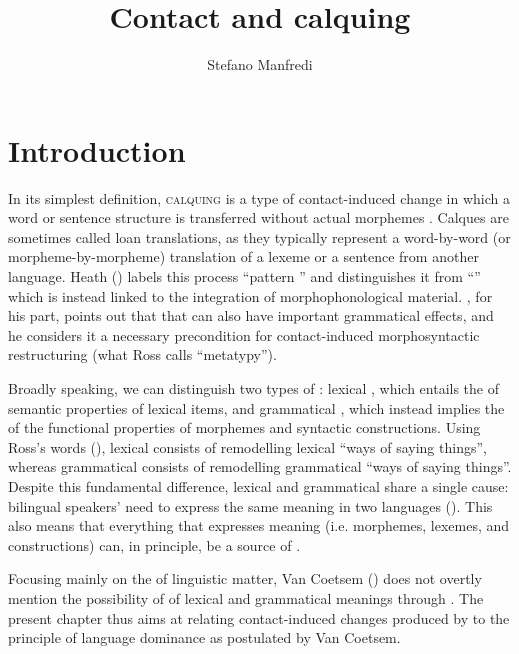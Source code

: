 \documentclass[output=paper]{langsci/langscibook}
\author{Stefano Manfredi\affiliation{CNRS, SeDyL}}
\title{Contact and calquing}
\begin{document}
\maketitle 
  

\section{Introduction}

In its simplest definition, \textsc{calquing} is a type of contact-induced change in which a word or sentence structure is transferred without actual morphemes \citep[260]{Thomason2001}. Calques are sometimes called loan translations, as they typically represent a word-by-word (or morpheme-by-morpheme) translation of a lexeme or a sentence from another language. Heath (\citeyear[367]{Heath1984}) labels this process “pattern ” and distinguishes it from “” which is instead linked to the integration of morphophonological material. \cite{Ross2007}, for his part, points out that that  can also have important grammatical effects, and he considers it a necessary precondition for contact-induced morphosyntactic restructuring (what Ross calls “metatypy”).  

Broadly speaking, we can distinguish two types of : lexical , which entails the  of semantic properties of lexical items, and grammatical , which instead implies the  of the functional properties of morphemes and syntactic constructions. Using Ross’s words (\citeyear[126]{Ross2007}), lexical  consists of remodelling lexical “ways of saying things”, whereas grammatical  consists of remodelling grammatical “ways of saying things”. Despite this fundamental difference, lexical and grammatical  share a single cause: bilingual speakers’ need to express the same meaning in two languages (\citealt[32]{Sasse1992}). This also means that everything that expresses meaning (i.e. morphemes, lexemes, and constructions) can, in principle, be a source of . 

Focusing mainly on the  of linguistic matter, Van Coetsem (\citeyear{VanCoetsem1988}) does not overtly mention the possibility of  of lexical and grammatical meanings through . The present chapter thus aims at relating contact-induced changes produced by  to the principle of language dominance as postulated by Van Coetsem. 
\end{document}
